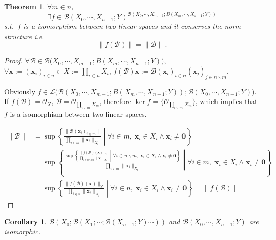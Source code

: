 \documentclass[openany]{book}
\theoremstyle{plain}
\newtheorem{theorem}{Theorem}[section] %
\newtheorem{corollary}{Corollary} %
\theoremstyle{definition}
\newcommand*{\bv}{\boldsymbol} %
\begin{document}
\begin{theorem}
	$\forall m \in n$, 
	\begin{equation*}
		\exists f \in \mathcal B(X_0, \cdots, X_{n-1}; Y)^{\mathcal B (X_0, \cdots, X_{m-1}; B(X_m, \cdots, X_{n-1}; Y))}
	\end{equation*}
	s.t.\ $f$ is a isomorphism between two linear spaces and it conserves the norm structure i.e.\ 
	\begin{equation*}
		\|f(\mathscr B)\| = \|\mathscr B\|\,.
	\end{equation*}
\end{theorem}
\begin{proof}
	$\forall \mathscr B \in \mathcal B \big(X_0, \cdots, X_{m-1}; B(X_m, \cdots, X_{n-1}; Y)\big)$, $\forall \bv x := (\bv x_i)_{i \in n} \in X := \prod_{i \in n} X_i$, $f(\mathscr B) \bv x := \mathscr B(\bv x_i)_{i \in n} (\bv x_j)_{j \in n \backslash m}$.

	Obviously $f \in \mathcal L\big(\mathcal B (X_0, \cdots, X_{m-1}; B(X_m, \cdots, X_{n-1}; Y)); \mathcal B(X_0, \cdots, X_{n-1}; Y)\big)$. 
	If $f(\mathscr B) = \mathscr O_X$, $\mathscr B = \mathscr O_{\prod_{i \in m} X_m}$, therefore $\ker f = \{\mathscr O_{\prod_{i \in m} X_m}\}$, which implies that $f$ is a isomorphism between two linear spaces.

	\begin{align*}
		\|\mathscr B\| &= \sup 
		\left\{ 
			\frac{\|\mathscr B(\bv x_i)_{i \in m}\|}{\prod_{i \in m} \|\bv x_i\|_{X_i}}
		\middle|
			\forall i \in m,\; \bv x_i \in X_i \wedge \bv x_i \neq \bv 0
		\right\}
		\\
		&= \sup 
		\left\{ 
			\frac{\sup \left\{ 
				\frac{\|f(\mathscr B)(\bv x)\|_Y}{\prod_{i \in n \backslash m} \|\bv x_i\|_{X_i}}
			\middle|
				\forall i \in n \backslash m,\; \bv x_i \in X_i \wedge \bv x_i \neq \bv 0
			\right\}}{\prod_{i \in m} \|\bv x_i\|_{X_i}}
		\middle|
			\forall i \in m,\; \bv x_i \in X_i \wedge \bv x_i \neq \bv 0
		\right\}
		\\
		&=
		\sup \left\{ 
				\frac{\|f(\mathscr B)(\bv x)\|_Y}{\prod_{i \in n} \|\bv x_i\|_{X_i}}
				\middle|
				\forall i \in n,\; \bv x_i \in X_i \wedge \bv x_i \neq \bv 0
			\right\}
		= \|f(\mathscr B)\|
	\end{align*}
\end{proof}

\begin{corollary}\label{corollary: important isomorphism}
	$\mathcal B(X_0; \mathcal B(X_1; \cdots; \mathcal B(X_{n-1}; Y) \cdots ))$  and $\mathcal B(X_0, \cdots, X_{n-1}; Y)$ are isomorphic.
\end{corollary}
\end{document}
